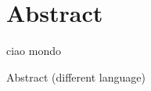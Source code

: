 %
\chapter*{Abstract}
\label{Ciao}
\vspace*{-10mm}

ciao mondo

\vspace*{20mm}

{Abstract (different language)}\label{sec:abstract-diff} \\

\blindtext

